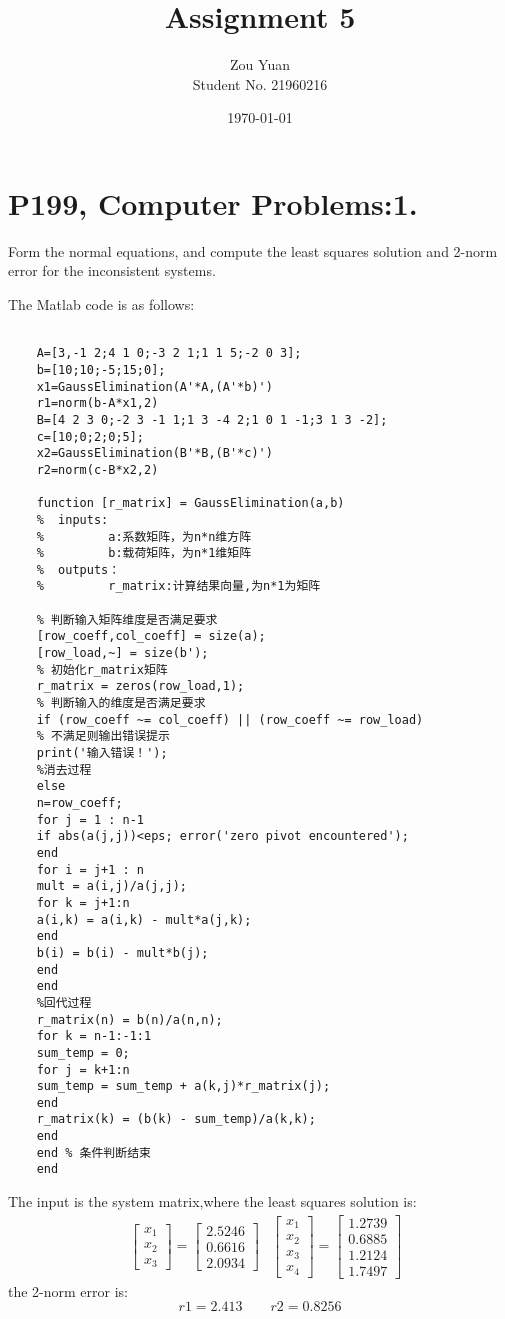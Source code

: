 \documentclass[UTF8]{ctexart}
\title{Assignment 5}  %
\author{Zou Yuan\\Student No. 21960216}   %
\date{\today}       %
\begin{document}
	\maketitle
	\section{P199, Computer Problems:1.}
	Form the normal equations, and compute the least squares solution and 2-norm error for the inconsistent systems.

	The Matlab code is as follows:
	
	\begin{centering}
	\begin{lstlisting}
	
	A=[3,-1 2;4 1 0;-3 2 1;1 1 5;-2 0 3];
	b=[10;10;-5;15;0]; 
	x1=GaussElimination(A'*A,(A'*b)')
	r1=norm(b-A*x1,2)
	B=[4 2 3 0;-2 3 -1 1;1 3 -4 2;1 0 1 -1;3 1 3 -2];
	c=[10;0;2;0;5];
	x2=GaussElimination(B'*B,(B'*c)')
	r2=norm(c-B*x2,2)
	
	function [r_matrix] = GaussElimination(a,b)
	%  inputs:
	%         a:系数矩阵，为n*n维方阵
	%         b:载荷矩阵，为n*1维矩阵
	%  outputs：
	%         r_matrix:计算结果向量,为n*1为矩阵
	
	% 判断输入矩阵维度是否满足要求
	[row_coeff,col_coeff] = size(a);
	[row_load,~] = size(b');
	% 初始化r_matrix矩阵
	r_matrix = zeros(row_load,1);
	% 判断输入的维度是否满足要求
	if (row_coeff ~= col_coeff) || (row_coeff ~= row_load)
	% 不满足则输出错误提示
	print('输入错误！');
	%消去过程
	else
	n=row_coeff;
	for j = 1 : n-1
	if abs(a(j,j))<eps; error('zero pivot encountered'); 
	end
	for i = j+1 : n
	mult = a(i,j)/a(j,j);
	for k = j+1:n
	a(i,k) = a(i,k) - mult*a(j,k);
	end
	b(i) = b(i) - mult*b(j);
	end
	end
	%回代过程
	r_matrix(n) = b(n)/a(n,n);
	for k = n-1:-1:1
	sum_temp = 0;
	for j = k+1:n
	sum_temp = sum_temp + a(k,j)*r_matrix(j);
	end
	r_matrix(k) = (b(k) - sum_temp)/a(k,k);
	end
	end % 条件判断结束
	end
	\end{lstlisting}
		\end{centering}
The input is the system matrix,where the least squares solution is:
\begin{align*}
&\begin{bmatrix}x_1\\x_2\\x_3\end{bmatrix}=\begin{bmatrix}
2.5246    \\ 0.6616   \\2.0934
\end{bmatrix}
&\begin{bmatrix}x_1\\x_2\\x_3\\x_4\end{bmatrix}=\begin{bmatrix}
1.2739\\ 0.6885 \\1.2124\\1.7497
\end{bmatrix}
\end{align*}
the 2-norm error is:$$r1 =2.413 \qquad r2 =0.8256$$
\end{document}
